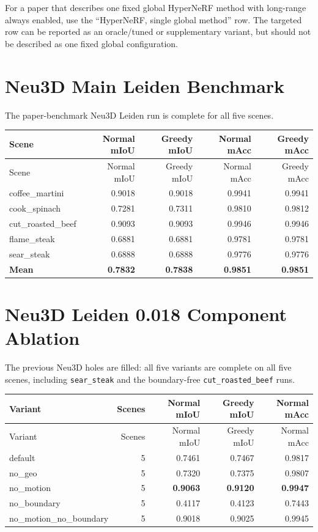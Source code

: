 \documentclass[10pt]{article}
\begin{document}
For a paper that describes one fixed global HyperNeRF method with long-range always enabled, use the ``HyperNeRF, single global method'' row.  The targeted row can be reported as an oracle/tuned or supplementary variant, but should not be described as one fixed global configuration.

\section{Neu3D Main Leiden Benchmark}
The paper-benchmark Neu3D Leiden run is complete for all five scenes.

\small
\begin{longtable}{lrrrr}
\toprule
Scene & Normal mIoU & Greedy mIoU & Normal mAcc & Greedy mAcc \\
\midrule
\endfirsthead
\toprule
Scene & Normal mIoU & Greedy mIoU & Normal mAcc & Greedy mAcc \\
\midrule
\endhead
coffee\_martini & 0.9018 & 0.9018 & 0.9941 & 0.9941 \\
cook\_spinach & 0.7281 & 0.7311 & 0.9810 & 0.9812 \\
cut\_roasted\_beef & 0.9093 & 0.9093 & 0.9946 & 0.9946 \\
flame\_steak & 0.6881 & 0.6881 & 0.9781 & 0.9781 \\
sear\_steak & 0.6888 & 0.6888 & 0.9776 & 0.9776 \\
\midrule
\textbf{Mean} & \textbf{0.7832} & \textbf{0.7838} & \textbf{0.9851} & \textbf{0.9851} \\
\bottomrule
\end{longtable}
\normalsize

\section{Neu3D Leiden 0.018 Component Ablation}
The previous Neu3D holes are filled: all five variants are complete on all five scenes, including \texttt{sear\_steak} and the boundary-free \texttt{cut\_roasted\_beef} runs.

\small
\begin{longtable}{lrrrr}
\toprule
Variant & Scenes & Normal mIoU & Greedy mIoU & Normal mAcc \\
\midrule
\endfirsthead
\toprule
Variant & Scenes & Normal mIoU & Greedy mIoU & Normal mAcc \\
\midrule
\endhead
default & 5 & 0.7461 & 0.7467 & 0.9817 \\
no\_geo & 5 & 0.7320 & 0.7375 & 0.9807 \\
no\_motion & 5 & \textbf{0.9063} & \textbf{0.9120} & \textbf{0.9947} \\
no\_boundary & 5 & 0.4117 & 0.4123 & 0.7443 \\
no\_motion\_no\_boundary & 5 & 0.9018 & 0.9025 & 0.9945 \\
\bottomrule
\end{longtable}
\normalsize
\end{document}
